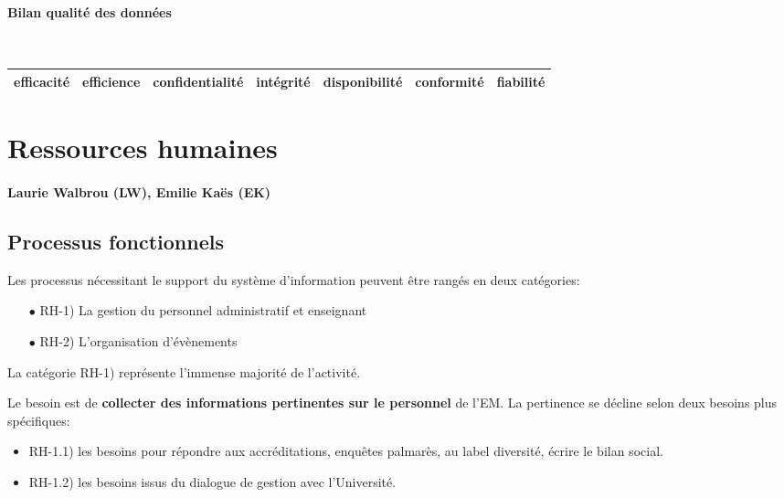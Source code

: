 \documentclass{book}
\begin{document}
\paragraph{Bilan qualité des données}
~\\


	\begin{tabular}{|l|l|l|l|l|l|l|}
	\hline
	efficacité	& efficience &	confidentialité	& intégrité & disponibilité & conformité & fiabilité \\
	\hline
	
	\hline
	\end{tabular}
	


\section{Ressources humaines}

\paragraph{Laurie Walbrou (LW), Emilie Kaës (EK)}


\subsection{Processus fonctionnels}
Les processus nécessitant le support du système d'information peuvent 
être rangés en deux catégories:
\begin{itemize}
\item[$\bullet$] RH-1) La gestion du personnel administratif et enseignant
\item[$\bullet$] RH-2) L'organisation d'évènements
\end{itemize}
\bigskip

La catégorie RH-1) représente l'immense majorité de l'activité.

Le besoin est de \textbf{collecter des informations pertinentes
sur le personnel} de l'EM. La pertinence se décline selon
deux besoins plus spécifiques:
\begin{itemize}
\item RH-1.1) les besoins pour répondre aux accréditations, enquêtes palmarès, 
	au label diversité, écrire le bilan social.
\item RH-1.2) les besoins issus du dialogue de gestion avec l'Université.
\end{itemize}
\end{document}
